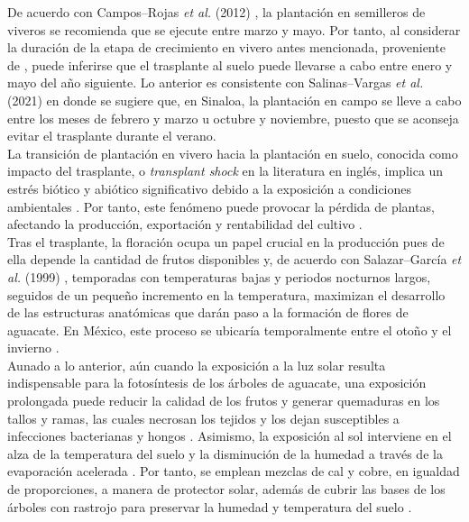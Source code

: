 De acuerdo con Campos--Rojas \textit{et al.} (2012) \cite{Campos-Rojas_2012}, la plantación en semilleros de viveros se recomienda que se ejecute entre marzo y mayo. Por tanto, al considerar la duración de la etapa de crecimiento en vivero antes mencionada, proveniente de \cite{SAGARPA_2017}, puede inferirse que el trasplante al suelo puede llevarse a cabo entre enero y mayo del año siguiente. Lo anterior es consistente con Salinas--Vargas \textit{et al.} (2021) \cite{CODESIN_2021} en donde se sugiere que, en Sinaloa, la plantación en campo se lleve a cabo entre los meses de febrero y marzo u octubre y noviembre, puesto que se aconseja evitar el trasplante durante el verano.\\


La transición de plantación en vivero hacia la plantación en suelo, conocida como impacto del trasplante, o \textit{transplant shock} en la literatura en inglés, implica un estrés biótico y abiótico significativo debido a la exposición a condiciones ambientales \cite{Close_2005, Mainhart_2024}. Por tanto, este fenómeno puede provocar la pérdida de plantas, afectando la producción, exportación y rentabilidad del cultivo \cite{Roka_2010}.\\

Tras el trasplante, la floración ocupa un papel crucial en la producción pues de ella depende la cantidad de frutos disponibles y, de acuerdo con Salazar--García \textit{et al.} (1999) \cite{Salazar_1999}, temporadas con temperaturas bajas y periodos nocturnos largos, seguidos de un pequeño incremento en la temperatura,  maximizan el desarrollo de las estructuras anatómicas que darán paso a la formación de flores de aguacate. En México, este proceso se ubicaría temporalmente entre el otoño y el invierno \cite{Acosta-Rangel_2021}.\\

Aunado a lo anterior, aún cuando la exposición a la luz solar resulta indispensable para la fotosíntesis de los árboles de aguacate, una exposición prolongada puede reducir la calidad de los frutos y generar quemaduras en los tallos y ramas, las cuales necrosan los tejidos y los dejan susceptibles a infecciones bacterianas y hongos \cite{Fischer_2022}. Asimismo, la exposición al sol interviene en el alza de la temperatura del suelo y la disminución de la humedad a través de la evaporación acelerada \cite{Haskell_2012}. Por tanto, se emplean mezclas de cal y cobre, en igualdad de proporciones, a manera de protector solar, además de cubrir las bases de los árboles con rastrojo para preservar la humedad y temperatura del suelo \cite{CODESIN_2021}.\\

